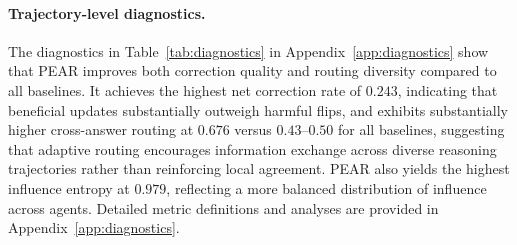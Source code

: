\paragraph{Trajectory-level diagnostics.}
The diagnostics in Table~\ref{tab:diagnostics} in Appendix~\ref{app:diagnostics} show that PEAR improves both correction quality and routing diversity compared to all baselines. It achieves the highest net correction rate of $0.243$, indicating that beneficial updates substantially outweigh harmful flips, and exhibits substantially higher cross-answer routing at $0.676$ versus $0.43$--$0.50$ for all baselines, suggesting that adaptive routing encourages information exchange across diverse reasoning trajectories rather than reinforcing local agreement. PEAR also yields the highest influence entropy at $0.979$, reflecting a more balanced distribution of influence across agents. Detailed metric definitions and analyses are provided in Appendix~\ref{app:diagnostics}.





